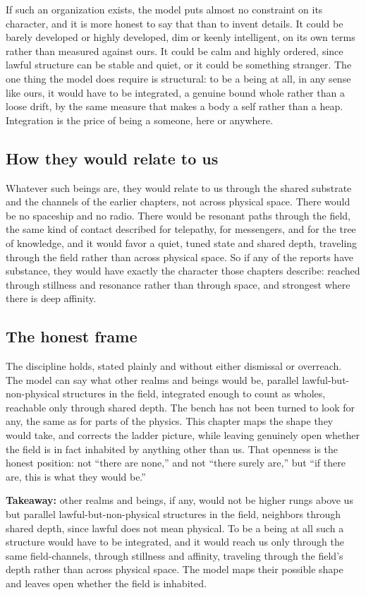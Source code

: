 If such an organization exists, the model puts almost no constraint on its character, and it is more honest to say that than to invent details. It could be barely developed or highly developed, dim or keenly intelligent, on its own terms rather than measured against ours. It could be calm and highly ordered, since lawful structure can be stable and quiet, or it could be something stranger. The one thing the model does require is structural: to be a being at all, in any sense like ours, it would have to be integrated, a genuine bound whole rather than a loose drift, by the same measure that makes a body a self rather than a heap. Integration is the price of being a someone, here or anywhere.

\subsection{How they would relate to us}

Whatever such beings are, they would relate to us through the shared substrate and the channels of the earlier chapters, not across physical space. There would be no spaceship and no radio. There would be resonant paths through the field, the same kind of contact described for telepathy, for messengers, and for the tree of knowledge, and it would favor a quiet, tuned state and shared depth, traveling through the field rather than across physical space. So if any of the reports have substance, they would have exactly the character those chapters describe: reached through stillness and resonance rather than through space, and strongest where there is deep affinity.

\subsection{The honest frame}

The discipline holds, stated plainly and without either dismissal or overreach. The model can say what other realms and beings would be, parallel lawful-but-non-physical structures in the field, integrated enough to count as wholes, reachable only through shared depth. The bench has not been turned to look for any, the same as for parts of the physics. This chapter maps the shape they would take, and corrects the ladder picture, while leaving genuinely open whether the field is in fact inhabited by anything other than us. That openness is the honest position: not ``there are none,'' and not ``there surely are,'' but ``if there are, this is what they would be.''

\textbf{Takeaway:} other realms and beings, if any, would not be higher rungs above us but parallel lawful-but-non-physical structures in the field, neighbors through shared depth, since lawful does not mean physical. To be a being at all such a structure would have to be integrated, and it would reach us only through the same field-channels, through stillness and affinity, traveling through the field's depth rather than across physical space. The model maps their possible shape and leaves open whether the field is inhabited.

